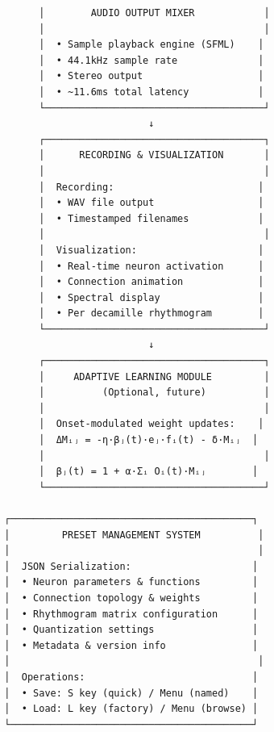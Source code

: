 \documentclass[11pt,a4paper]{article}
\begin{document}
\begin{figure}[h]
\begin{verbatim}
              │        AUDIO OUTPUT MIXER            │
              │                                      │
              │  • Sample playback engine (SFML)    │
              │  • 44.1kHz sample rate              │
              │  • Stereo output                    │
              │  • ~11.6ms total latency            │
              └──────────────────────────────────────┘
                                 ↓
              ┌──────────────────────────────────────┐
              │      RECORDING & VISUALIZATION       │
              │                                      │
              │  Recording:                         │
              │  • WAV file output                  │
              │  • Timestamped filenames            │
              │                                      │
              │  Visualization:                     │
              │  • Real-time neuron activation      │
              │  • Connection animation             │
              │  • Spectral display                 │
              │  • Per decamille rhythmogram        │
              └──────────────────────────────────────┘
                                 ↓
              ┌──────────────────────────────────────┐
              │     ADAPTIVE LEARNING MODULE         │
              │          (Optional, future)          │
              │                                      │
              │  Onset-modulated weight updates:    │
              │  ΔMᵢⱼ = -η·βⱼ(t)·eⱼ·fᵢ(t) - δ·Mᵢⱼ  │
              │                                      │
              │  βⱼ(t) = 1 + α·Σᵢ Oᵢ(t)·Mᵢⱼ        │
              └──────────────────────────────────────┘

        ┌──────────────────────────────────────────┐
        │         PRESET MANAGEMENT SYSTEM          │
        │                                           │
        │  JSON Serialization:                     │
        │  • Neuron parameters & functions         │
        │  • Connection topology & weights         │
        │  • Rhythmogram matrix configuration      │
        │  • Quantization settings                 │
        │  • Metadata & version info               │
        │                                           │
        │  Operations:                             │
        │  • Save: S key (quick) / Menu (named)    │
        │  • Load: L key (factory) / Menu (browse) │
        └──────────────────────────────────────────┘


\end{verbatim}
\end{figure}
\end{document}

